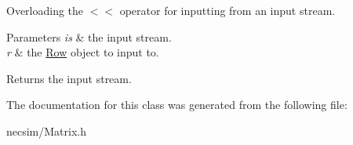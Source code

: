 Overloading the $<$$<$ operator for inputting from an input stream. 


\begin{DoxyParams}{Parameters}
{\em is} & the input stream. \\
\hline
{\em r} & the \hyperlink{class_row}{Row} object to input to. \\
\hline
\end{DoxyParams}
\begin{DoxyReturn}{Returns}
the input stream. 
\end{DoxyReturn}


The documentation for this class was generated from the following file\+:\begin{DoxyCompactItemize}
\item 
necsim/Matrix.\+h\end{DoxyCompactItemize}
